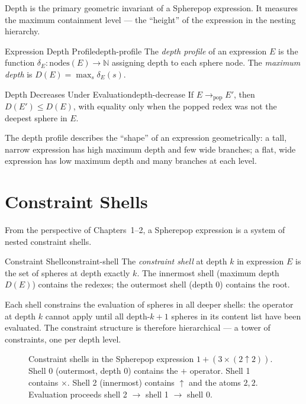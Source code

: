 Depth is the primary geometric invariant of a Spherepop expression.
It measures the maximum containment level — the ``height'' of the
expression in the nesting hierarchy.

\begin{definition}{Expression Depth Profile}{depth-profile}
  The \emph{depth profile} of an expression $E$ is the function
  $\delta_E : \mathrm{nodes}(E) \to \mathbb{N}$ assigning depth to
  each sphere node. The \emph{maximum depth} is
  $D(E) = \max_{s} \delta_E(s)$.
\end{definition}

\begin{proposition}{Depth Decreases Under Evaluation}{depth-decrease}
  If $E \to_\text{pop} E'$, then $D(E') \leq D(E)$, with equality only
  when the popped redex was not the deepest sphere in $E$.
\end{proposition}

The depth profile describes the ``shape'' of an expression geometrically:
a tall, narrow expression has high maximum depth and few wide branches;
a flat, wide expression has low maximum depth and many branches at each
level.

\section{Constraint Shells}

From the perspective of Chapters~1–2, a Spherepop expression is a
system of nested constraint shells.

\begin{definition}{Constraint Shell}{constraint-shell}
  The \emph{constraint shell} at depth $k$ in expression $E$ is the
  set of spheres at depth exactly $k$. The innermost shell (maximum
  depth $D(E)$) contains the redexes; the outermost shell (depth 0)
  contains the root.
\end{definition}

Each shell constrains the evaluation of spheres in all deeper shells:
the operator at depth $k$ cannot apply until all depth-$k+1$ spheres
in its content list have been evaluated. The constraint structure is
therefore hierarchical — a tower of constraints, one per depth level.

\begin{figure}[h]
  \centering
  \begin{tikzpicture}[scale=1.0]
    
  \end{tikzpicture}
  \caption{Constraint shells in the Spherepop expression
    $1 + (3 \times (2 \uparrow 2))$. Shell 0 (outermost, depth 0)
    contains the $+$ operator. Shell 1 contains $\times$. Shell 2
    (innermost) contains $\uparrow$ and the atoms $2, 2$. Evaluation
    proceeds shell 2 $\to$ shell 1 $\to$ shell 0.}
  \label{fig:expression-shells}
\end{figure}

